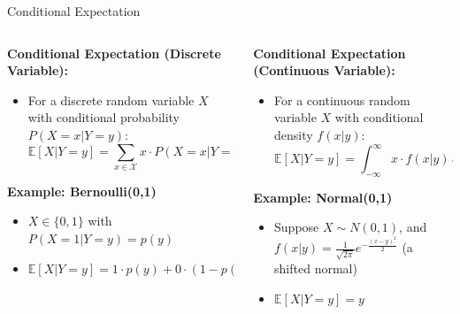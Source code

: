 \documentclass[xcolor=svgnames,t]{beamer}
\begin{document}
\begin{frame}{Conditional Expectation }
    \begin{columns}
        \begin{column}{0.45\textwidth}
            \textbf{Conditional Expectation (Discrete Variable):}
            \begin{itemize}
                \item For a discrete random variable \( X \) with conditional probability \( P(X = x | Y = y) \):
                \[
                \mathbb{E}[X | Y = y] = \sum_{x \in \mathcal{X}} x \cdot P(X = x | Y = y)
                \]
            \end{itemize}
            
            \pause
            
            \vspace{0.3cm}
            
            \textbf{Example: Bernoulli(0,1)}
            \begin{itemize}
                \item \( X \in \{0,1\} \) with \( P(X = 1 | Y = y) = p(y) \) 
                \item \( \mathbb{E}[X | Y = y] = 1 \cdot p(y) + 0 \cdot (1 - p(y)) = p(y) \)
            \end{itemize}
        \end{column}
        
        \pause
        
        \begin{column}{0.45\textwidth}
            \textbf{Conditional Expectation (Continuous Variable):}
            \begin{itemize}
                \item For a continuous random variable \( X \) with conditional density \( f(x | y) \):
                \[
                \mathbb{E}[X | Y = y] = \int_{-\infty}^{\infty} x \cdot f(x | y) \, dx
                \]
            \end{itemize}
            
            \pause
            
            \vspace{0.3cm}
            
            \textbf{Example: Normal(0,1)}
            \begin{itemize}
                \item Suppose \( X \sim N(0, 1) \), and \( f(x | y) = \frac{1}{\sqrt{2\pi}} e^{-\frac{(x - y)^2}{2}} \) (a shifted normal)
                \item \( \mathbb{E}[X | Y = y] = y \)
            \end{itemize}
        \end{column}
    \end{columns}
\end{frame} 
\end{document}
